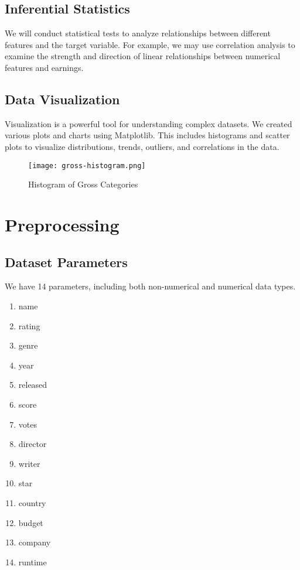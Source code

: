 \documentclass[conference]{IEEEtran}
\begin{document}
    \subsection{Inferential Statistics}
        We will conduct statistical tests to analyze relationships between different features and the target variable. For example, we may use correlation analysis to examine the strength and direction of linear relationships between numerical features and earnings.

    \subsection{Data Visualization}
        Visualization is a powerful tool for understanding complex datasets. We created various plots and charts using Matplotlib. This includes histograms and scatter plots to visualize distributions, trends, outliers, and correlations in the data.

        \begin{figure}[H]
            \centering
            \texttt{[image: gross-histogram.png]}
            \caption{Histogram of Gross Categories}
            \label{fig:gross-histogram}
        \end{figure}

\section{Preprocessing}
    \subsection{Dataset Parameters}
        We have 14 parameters, including both non-numerical and numerical data types.

        \begin{enumerate}
            \item name
            \item rating
            \item genre
            \item year
            \item released
            \item score
            \item votes
            \item director
            \item writer
            \item star
            \item country
            \item budget
            \item company
            \item runtime
        \end{enumerate}
\end{document}
